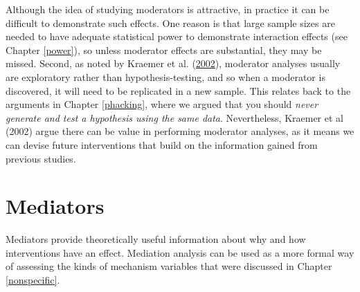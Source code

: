 \documentclass{krantz}
\begin{document}
Although the idea of studying moderators is attractive, in practice it can be difficult to demonstrate such effects. One reason is that large sample sizes are needed to have adequate statistical power to demonstrate interaction effects (see Chapter \ref{power}), so unless moderator effects are substantial, they may be missed. Second, as noted by Kraemer et al. (\protect\hyperlink{ref-kraemer2002}{2002}), moderator analyses usually are exploratory rather than hypothesis-testing, and so when a moderator is discovered, it will need to be replicated in a new sample. This relates back to the arguments in Chapter \ref{phacking}, where we argued that you should \emph{never generate and test a hypothesis using the same data}. Nevertheless, Kraemer et al (2002) argue there can be value in performing moderator analyses, as it means we can devise future interventions that build on the information gained from previous studies.

\hypertarget{mediators-1}{%
\section{Mediators}\label{mediators-1}}

Mediators provide theoretically useful information about why and how interventions have an effect. Mediation analysis can be used as a more formal way of assessing the kinds of mechanism variables that were discussed in Chapter \ref{nonspecific}.
\end{document}

